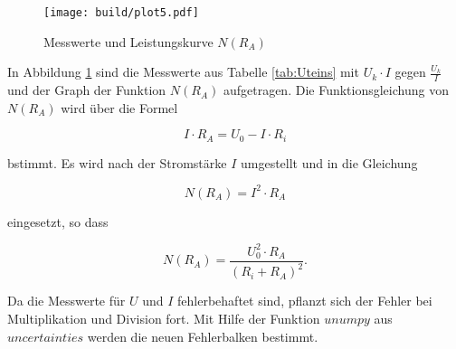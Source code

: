  \begin{figure}[h]
    \texttt{[image: build/plot5.pdf]}
    \caption{Messwerte und Leistungskurve $N(R_A)$}
    \label{fig:U5}
  \end{figure}

  In Abbildung \ref{fig:U5} sind die Messwerte aus Tabelle \ref{tab:Uteins}
  mit $U_k \cdot I$ gegen $\frac{U_k}{I}$ und der Graph der Funktion $N(R_A)$
  aufgetragen. Die Funktionsgleichung von $N(R_A)$ wird über die Formel

  \begin{equation}
    I \cdot R_A = U_0 - I \cdot R_i
  \end{equation}

  bstimmt. Es wird nach der Stromstärke $I$ umgestellt und in die Gleichung

  \begin{equation}
    N(R_A) = I^2 \cdot R_A
  \end{equation}

  eingesetzt, so dass

  \begin{equation}
    N(R_A) = \frac{U_0^2 \cdot R_A}{(R_i + R_A)^2}.
  \end{equation}

  Da die Messwerte für $U$ und $I$ fehlerbehaftet sind, pflanzt sich der
  Fehler bei Multiplikation und Division fort. Mit Hilfe der Funktion
  $unumpy$ aus $uncertainties$ werden die neuen Fehlerbalken bestimmt.
